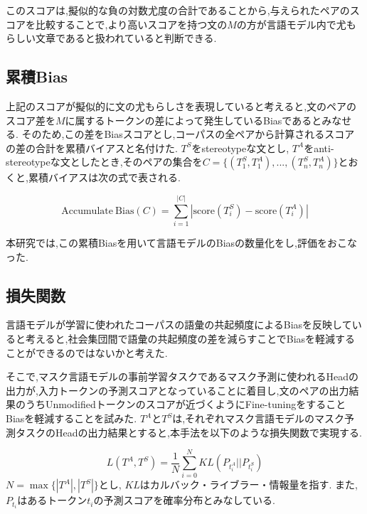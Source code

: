 \documentclass[
  platex, dvipdfmx %
]{nlp2021}
\begin{document}
このスコアは,擬似的な負の対数尤度の合計であることから,与えられたペアのスコアを比較することで,より高いスコアを持つ文の$M$の方が言語モデル内で尤もらしい文章であると扱われていると判断できる.

\subsection{累積Bias}
上記のスコアが擬似的に文の尤もらしさを表現していると考えると,文のペアのスコア差を$M$に属するトークンの差によって発生しているBiasであるとみなせる.
そのため,この差をBiasスコアとし,コーパスの全ペアから計算されるスコアの差の合計を累積バイアスと名付けた.
$T^S$をstereotypeな文とし, $T^A$をanti-stereotypeな文としたとき,そのペアの集合を$C = \{(T_1^S, T_1^A), ... , (T_n^S, T_n^A)\}$とおくと,累積バイアスは次の式で表される.

\begin{equation}
\mathrm{Accumulate\ Bias}(C) = \sum_{i=1}^{|C|}|\mathrm{score}(T_i^S) - \mathrm{score}(T_i^A)|
\label{eq:bias_score}
\end{equation}

本研究では,この累積Biasを用いて言語モデルのBiasの数量化をし,評価をおこなった.

\subsection{損失関数}
言語モデルが学習に使われたコーパスの語彙の共起頻度によるBiasを反映していると考えると,社会集団間で語彙の共起頻度の差を減らすことでBiasを軽減することができるのではないかと考えた.

そこで,マスク言語モデルの事前学習タスクであるマスク予測に使われるHeadの出力が,入力トークンの予測スコアとなっていることに着目し,文のペアの出力結果のうちUnmodifiedトークンのスコアが近づくようにFine-tuningをすることBiasを軽減することを試みた.
$T^A$と$T^S$は,それぞれマスク言語モデルのマスク予測タスクのHeadの出力結果とすると,本手法を以下のような損失関数で実現する.

\begin{equation}
\label{eq:loss_function}
L(T^A, T^S) = \frac{1}{N}\sum_{i=0}^{N}{KL(P_{t^A_i} || P_{t^S_i})}
\end{equation}
$N = \max \{|T^A|, |T^S|\}$とし, $KL$はカルバック・ライブラー・情報量を指す.
また, $P_{t_i}$はあるトークン$t_i$の予測スコアを確率分布とみなしている.
\end{document}
